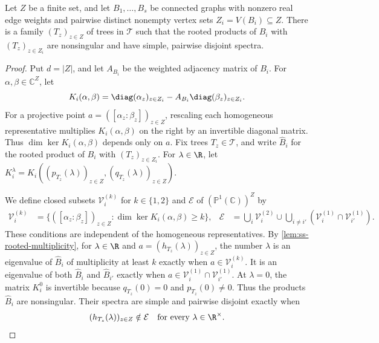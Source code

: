 \begin{lemma}\label{lem:ss-separation}
Let $Z$ be a finite set, and let $B_1,\ldots,B_s$ be connected graphs
with nonzero real edge weights and pairwise distinct nonempty vertex sets
$Z_i=V(B_i)\subseteq Z$.
There is a family $(T_z)_{z\in Z}$ of trees in $\mathcal T$ such that the rooted products
of $B_i$ with $(T_z)_{z\in Z_i}$ are nonsingular and have simple, pairwise
disjoint spectra.
\end{lemma}
\begin{proof}
Put $d=|Z|$, and let $A_{B_i}$ be the weighted adjacency matrix of $B_i$.
For $\alpha,\beta\in\mathbb C^Z$, let
\begin{equation}\label{eq:ss-core}
 K_i(\alpha,\beta)=\diag(\alpha_z)_{z\in Z_i}-A_{B_i}\diag(\beta_z)_{z\in Z_i}.
\end{equation}
For a projective point $a=([\alpha_z:\beta_z])_{z\in Z}$,
rescaling each homogeneous representative multiplies $K_i(\alpha,\beta)$
on the right by an invertible diagonal matrix.
Thus $\dim\ker K_i(\alpha,\beta)$ depends only on $a$.
Fix trees $T_z\in\mathcal T$, and write $\widehat B_i$ for the rooted
product of $B_i$ with $(T_z)_{z\in Z_i}$.
For $\lambda\in\R$, let
$K_i^\lambda=K_i((p_{T_z}(\lambda))_{z\in Z},(q_{T_z}(\lambda))_{z\in Z})$.

We define closed subsets $\mathcal V_i^{(k)}$ for $k\in\{1,2\}$
and $\mathcal E$ of $(\mathbb P^1(\mathbb C))^Z$ by
\begin{equation}\label{eq:ss-bad-sets}
 \begin{aligned}
 \mathcal V_i^{(k)}&=\{([\alpha_z:\beta_z])_{z\in Z}:\dim\ker K_i(\alpha,\beta)\ge k\}, &
 \mathcal E&=\bigcup_i\mathcal V_i^{(2)}
       \cup\bigcup_{i\ne i'}(\mathcal V_i^{(1)}\cap \mathcal V_{i'}^{(1)}).
 \end{aligned}
\end{equation}
These conditions are independent of the homogeneous representatives.
By \cref{lem:ss-rooted-multiplicity}, for $\lambda\in\R$ and
$a=(h_{T_z}(\lambda))_{z\in Z}$, the number $\lambda$ is an eigenvalue
of $\widehat B_i$ of multiplicity at least $k$ exactly when
$a\in\mathcal V_i^{(k)}$.
It is an eigenvalue of both $\widehat B_i$ and $\widehat B_{i'}$ exactly
when $a\in\mathcal V_i^{(1)}\cap\mathcal V_{i'}^{(1)}$.
At $\lambda=0$, the matrix $K_i^0$ is invertible
because $q_{T_z}(0)=0$ and $p_{T_z}(0)\ne0$.
Thus the products $\widehat B_i$ are nonsingular.
Their spectra are simple and pairwise disjoint exactly when
\begin{equation}\label{eq:ss-bad}
 (h_{T_z}(\lambda))_{z\in Z}\notin\mathcal E
 \quad\text{for every }\lambda\in\R^\times.
\end{equation}


\end{proof}
